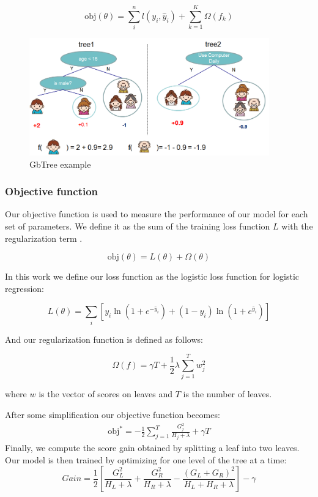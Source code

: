 \documentclass[cic,tc,english]{iiufrgs}
\begin{document}
$$\text{obj}(\theta) = \sum_i^n l(y_i, \hat{y}_i) + \sum_{k=1}^K \Omega(f_k)$$

\begin{figure}
    \caption{GbTree example}
    \begin{center}
        \includegraphics[width=28em]{twocart}
    \end{center}
    \label{fig:ex1}
\end{figure}

\subsubsection{Objective function}
Our objective function is used to measure the performance of our model for each set of parameters. We define it as the sum of the training loss function \(L\) with the regularization term \Omega.

$$\text{obj}(\theta) = L(\theta) + \Omega(\theta)$$

In this work we define our loss function as the logistic loss function for logistic regression:

$$L(\theta) = \sum_i[ y_i\ln (1+e^{-\hat{y}_i}) + (1-y_i)\ln (1+e^{\hat{y}_i})]$$

And our regularization function is defined as follows:

$$\Omega(f) = \gamma T + \frac{1}{2}\lambda \sum_{j=1}^T w_j^2$$

where \(w\) is the vector of scores on leaves and \(T\) is the number of leaves.

After some simplification our objective function becomes:
$$
\begin{split}
\text{obj}^\ast = -\frac{1}{2} \sum_{j=1}^T \frac{G_j^2}{H_j+\lambda} + \gamma T
\end{split}
$$
Finally, we compute the score gain obtained by splitting a leaf into two leaves. Our model is then trained by optimizing for one level of the tree at a time:
$$
Gain = \frac{1}{2} \left[\frac{G_L^2}{H_L+\lambda}+\frac{G_R^2}{H_R+\lambda}-\frac{(G_L+G_R)^2}{H_L+H_R+\lambda}\right] - \gamma
$$
\end{document}
